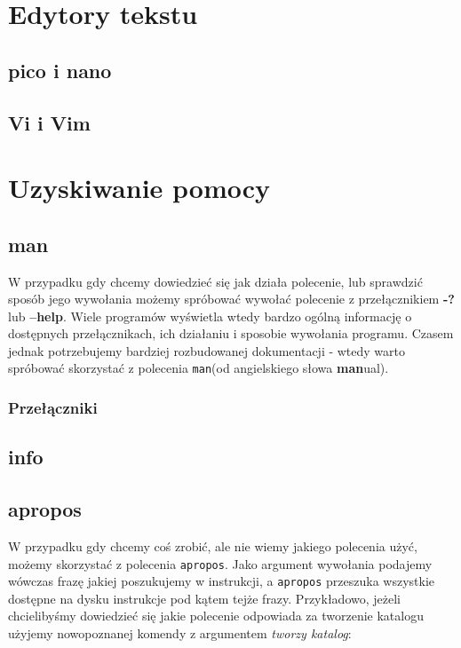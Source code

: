 \documentclass[10 pt, a4paper, draft]{article}
\begin{document}
\newpage
\section{Edytory tekstu}
\subsection{pico i nano}
\subsection{Vi i Vim}

\newpage
\section{Uzyskiwanie pomocy}
\subsection{man}
W przypadku gdy chcemy dowiedzieć się jak działa polecenie, lub sprawdzić sposób jego wywołania możemy spróbować wywołać polecenie z przełącznikiem \textbf{-?} lub \textbf{--help}. Wiele programów wyświetla wtedy bardzo ogólną informację o dostępnych przełącznikach, ich działaniu i sposobie wywołania programu. Czasem jednak potrzebujemy bardziej rozbudowanej dokumentacji - wtedy warto spróbować skorzystać z polecenia \texttt{man}(od angielskiego słowa \textbf{man}ual).
\subsubsection*{Przełączniki}
\subsection{info}
\subsection{apropos}
W przypadku gdy chcemy coś zrobić, ale nie wiemy jakiego polecenia użyć, możemy skorzystać z polecenia \texttt{apropos}. Jako argument wywołania podajemy wówczas frazę jakiej poszukujemy w instrukcji, a \texttt{apropos} przeszuka wszystkie dostępne na dysku instrukcje pod kątem tejże frazy. Przykładowo, jeżeli chcielibyśmy dowiedzieć się jakie polecenie odpowiada za tworzenie katalogu  użyjemy nowopoznanej komendy z argumentem \textit{tworzy katalog}:
\newline
\end{document}
